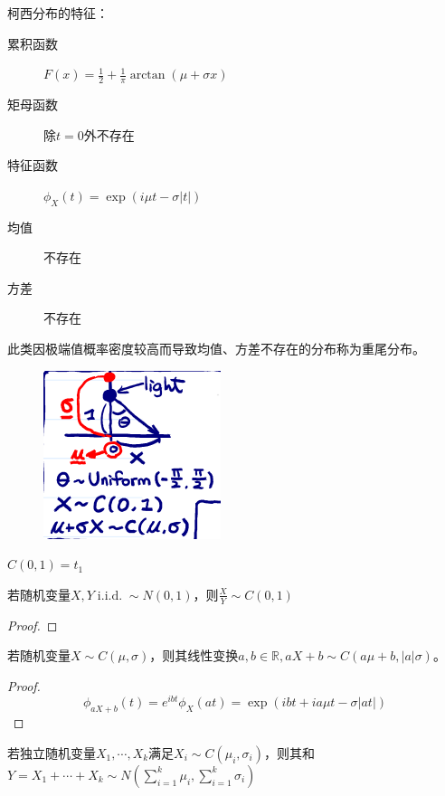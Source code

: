 柯西分布的特征：
\begin{description}
    \item[累积函数] $F(x)=\frac{1}{2}+\frac{1}{\pi} \arctan(\mu +\sigma x)$
    \item[矩母函数] 除$t=0$外不存在
    \item[特征函数] $\phi_X(t)=\exp (i \mu t - \sigma |t|)$
    \item[均值] 不存在
    \item[方差] 不存在
\end{description}

\begin{remark}
    此类因极端值概率密度较高而导致均值、方差不存在的分布称为重尾分布。
\end{remark}

\begin{figure}
    \centering
    \includegraphics{image/Cauchy_dist.png}
\end{figure}

\begin{proposition}
    $C(0,1)=t_1$
\end{proposition}

\begin{proposition}
    若随机变量$X,Y \operatorname{i.i.d.} \sim N(0,1)$，则$\frac{X}{Y} \sim C(0,1)$
\end{proposition}

\begin{proof}
\end{proof}

\begin{proposition}
    若随机变量$X \sim C(\mu, \sigma)$，则其线性变换$a,b \in \mathbb{R},aX + b \sim C(a \mu + b,|a| \sigma)$。
\end{proposition}

\begin{proof}
    \[ \phi_{aX + b}(t)=e^{ibt}\phi_X(a t)=\exp (ibt + ia\mu t-\sigma|a t|) \]
\end{proof}

\begin{proposition}
    若独立随机变量$X_1,\cdots ,X_k$满足$ X_i \sim C(\mu_i,\sigma_i)$，则其和$Y=X_1+\cdots +X_k \sim N(\sum_{i=1}^k\mu_i,\sum_{i=1}^k\sigma_i)$
\end{proposition}

